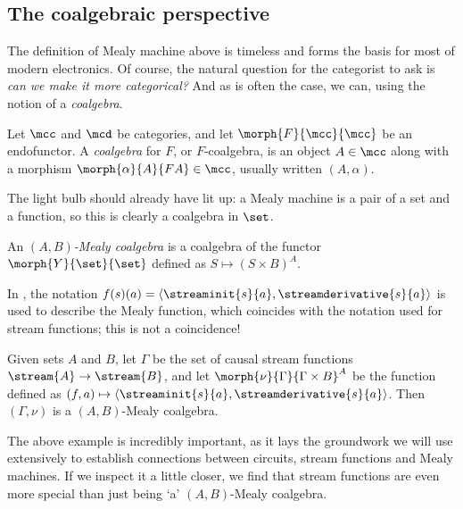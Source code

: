 \begin{example}
\end{example}

\subsection{The coalgebraic perspective}

The definition of Mealy machine above is timeless and forms the basis for most
of modern electronics.
Of course, the natural question for the categorist to ask is
\emph{can we make it more categorical?}
And as is often the case, we can, using the notion of a \emph{coalgebra}.

\begin{definition}[Coalgebra]
    Let \(\mcc\) and \(\mcd\) be categories, and let \(\morph{F}{\mcc}{\mcc}\)
    be an endofunctor.
    A \emph{coalgebra} for \(F\), or \(F\)-coalgebra, is an object
    \(A \in \mcc\) along with a morphism \(\morph{\alpha}{A}{FA} \in \mcc\),
    usually written \((A,\alpha)\).
\end{definition}

The light bulb should already have lit up: a Mealy machine is a pair of a set
and a function, so this is clearly a coalgebra in \(\set\).

\begin{definition}
    An \emph{\((A,B)\)-Mealy coalgebra} is a coalgebra of the functor
    \(\morph{Y}{\set}{\set}\) defined as \(S \mapsto (S \times B)^A\).
\end{definition}

\begin{example}
    In \cite{bonsangue2008coalgebraic}, the notation \(
        f(s)(a) = \langle{\streaminit{s}{a},\streamderivative{s}{a}}\rangle
    \) is used to describe the Mealy function, which coincides with the notation
    used for stream functions; this is not a coincidence!

    Given sets \(A\) and \(B\), let \(\Gamma\) be the set of causal stream
    functions \(\stream{A} \to \stream{B}\), and let
    \(\morph{\nu}{\Gamma}{\Gamma \times B}^A\) be the function defined as \(
        (f, a) \mapsto \langle{\streaminit{s}{a},\streamderivative{s}{a}}\rangle
    \).
    Then \((\Gamma,\nu)\) is a \((A,B)\)-Mealy coalgebra.
\end{example}

The above example is incredibly important, as it lays the groundwork we will
use extensively to establish connections between circuits, stream functions and
Mealy machines.
If we inspect it a little closer, we find that stream functions are even more
special than just being `a' \((A,B)\)-Mealy coalgebra.

